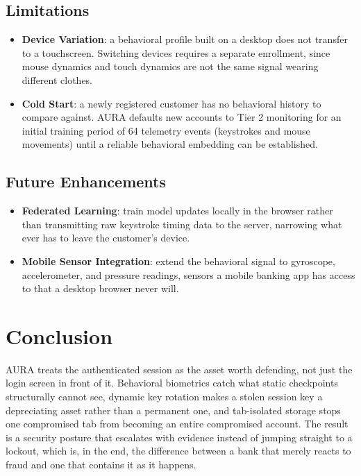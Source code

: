 \documentclass[11pt,journal,onecolumn]{article}
\begin{document}
\subsection{Limitations}
\begin{itemize}
    \item \textbf{Device Variation}: a behavioral profile built on a desktop does not transfer to a touchscreen. Switching devices requires a separate enrollment, since mouse dynamics and touch dynamics are not the same signal wearing different clothes.
    \item \textbf{Cold Start}: a newly registered customer has no behavioral history to compare against. AURA defaults new accounts to Tier 2 monitoring for an initial training period of 64 telemetry events (keystrokes and mouse movements) until a reliable behavioral embedding can be established.
\end{itemize}

\subsection{Future Enhancements}
\begin{itemize}
    \item \textbf{Federated Learning}: train model updates locally in the browser rather than transmitting raw keystroke timing data to the server, narrowing what ever has to leave the customer's device.
    \item \textbf{Mobile Sensor Integration}: extend the behavioral signal to gyroscope, accelerometer, and pressure readings, sensors a mobile banking app has access to that a desktop browser never will.
\end{itemize}

\section{Conclusion}
AURA treats the authenticated session as the asset worth defending, not just the login screen in front of it. Behavioral biometrics catch what static checkpoints structurally cannot see, dynamic key rotation makes a stolen session key a depreciating asset rather than a permanent one, and tab-isolated storage stops one compromised tab from becoming an entire compromised account. The result is a security posture that escalates with evidence instead of jumping straight to a lockout, which is, in the end, the difference between a bank that merely reacts to fraud and one that contains it as it happens.
\end{document}
